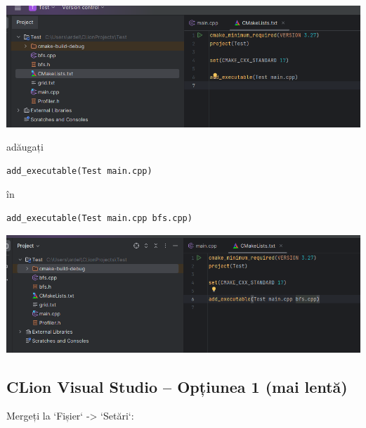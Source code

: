 \documentclass[../ro-fa-lab.tex]{subfiles}
\begin{document}
\includegraphics[width=\textwidth,alt={A screenshot of a computer Description automatically generated}]{./Resources/tutorial_lab9/image17.png}

adăugați

\begin{verbatim}
add_executable(Test main.cpp)
\end{verbatim}

în

\begin{verbatim}
add_executable(Test main.cpp bfs.cpp)
\end{verbatim}

\includegraphics[width=\textwidth,alt={A screenshot of a computer Description automatically generated}]{./Resources/tutorial_lab9/image18.png}

\subsection{CLion Visual Studio – Opțiunea 1 (mai lentă)}\label{clion-visual-studio-option-1-slower}

Mergeți la `Fișier` -> `Setări`:
\end{document}
